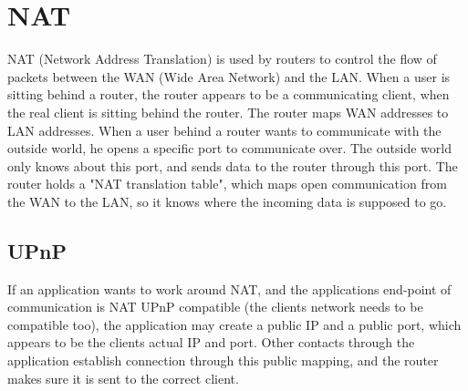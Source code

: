 \section{NAT}
NAT (Network Address Translation) is used by routers to control the flow of
packets between the WAN (Wide Area Network) and the LAN. When a user is sitting
behind a router, the router appears to be a communicating client, when the real
client is sitting behind the router. The router maps WAN addresses to LAN
addresses. When a user behind a router wants to communicate with the outside
world, he opens a specific port to communicate over. The outside world only
knows about this port, and sends data to the router through this port. The
router holds a "NAT translation table", which maps open communication from the
WAN to the LAN, so it knows where the incoming data is supposed to go.

\subsection{UPnP}
If an application wants to work around NAT, and the applications end-point of
communication is NAT UPnP compatible (the clients network needs to be
compatible too), the application may create a public IP and a public port, which
appears to be the clients actual IP and port. Other contacts through the
application establish connection through this public mapping, and the router
makes sure it is sent to the correct client.